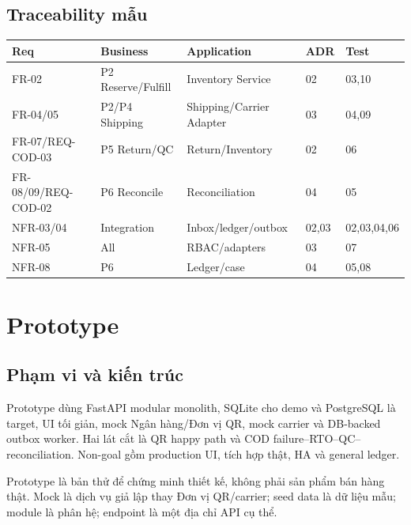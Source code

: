 \documentclass[12pt,a4paper]{report}
\begin{document}
\section{Traceability mẫu}
\begin{longtable}{p{}p{}p{}p{}p{}}
\toprule
\textbf{Req} & \textbf{Business} & \textbf{Application} & \textbf{ADR} & \textbf{Test}\\
\midrule\endhead
FR-02 & P2 Reserve/Fulfill & Inventory Service & 02 & 03,10\\
FR-04/05 & P2/P4 Shipping & Shipping/Carrier Adapter & 03 & 04,09\\
FR-07/REQ-COD-03 & P5 Return/QC & Return/Inventory & 02 & 06\\
FR-08/09/REQ-COD-02 & P6 Reconcile & Reconciliation & 04 & 05\\
NFR-03/04 & Integration & Inbox/ledger/outbox & 02,03 & 02,03,04,06\\
NFR-05 & All & RBAC/adapters & 03 & 07\\
NFR-08 & P6 & Ledger/case & 04 & 05,08\\
\bottomrule
\end{longtable}

\chapter{Prototype}

\section{Phạm vi và kiến trúc}
Prototype dùng FastAPI modular monolith, SQLite cho demo và PostgreSQL là target, UI tối giản, mock Ngân hàng/Đơn vị QR, mock carrier và DB-backed outbox worker. Hai lát cắt là QR happy path và COD failure--RTO--QC--reconciliation. Non-goal gồm production UI, tích hợp thật, HA và general ledger.

Prototype là bản thử để chứng minh thiết kế, không phải sản phẩm bán hàng thật. Mock là dịch vụ giả lập thay Đơn vị QR/carrier; seed data là dữ liệu mẫu; module là phân hệ; endpoint là một địa chỉ API cụ thể.
\end{document}
